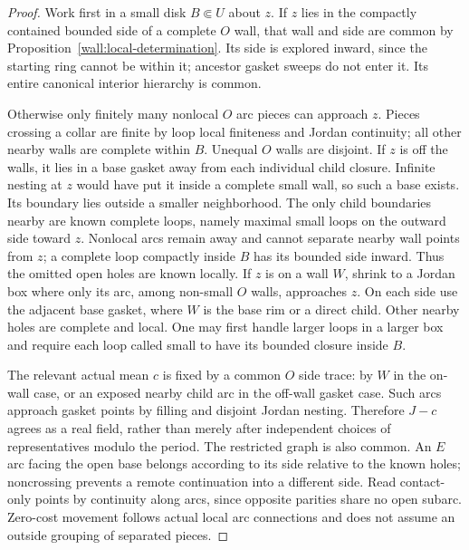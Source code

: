 \begin{proof}
Work first in a small disk $B\Subset U$ about $z$.  If $z$ lies in the compactly contained bounded side of a complete $O$ wall, that wall and side are common by Proposition~\ref{wall:local-determination}.  Its side is explored inward, since the starting ring cannot be within it; ancestor gasket sweeps do not enter it.  Its entire canonical interior hierarchy is common.

Otherwise only finitely many nonlocal $O$ arc pieces can approach $z$.  Pieces crossing a collar are finite by loop local finiteness and Jordan continuity; all other nearby walls are complete within $B$.  Unequal $O$ walls are disjoint.  If $z$ is off the walls, it lies in a base gasket away from each individual child closure.  Infinite nesting at $z$ would have put it inside a complete small wall, so such a base exists.  Its boundary lies outside a smaller neighborhood.  The only child boundaries nearby are known complete loops, namely maximal small loops on the outward side toward $z$.  Nonlocal arcs remain away and cannot separate nearby wall points from $z$; a complete loop compactly inside $B$ has its bounded side inward.  Thus the omitted open holes are known locally.  If $z$ is on a wall $W$, shrink to a Jordan box where only its arc, among non-small $O$ walls, approaches $z$.  On each side use the adjacent base gasket, where $W$ is the base rim or a direct child.  Other nearby holes are complete and local.  One may first handle larger loops in a larger box and require each loop called small to have its bounded closure inside $B$.

The relevant actual mean $c$ is fixed by a common $O$ side trace: by $W$ in the on-wall case, or an exposed nearby child arc in the off-wall gasket case.  Such arcs approach gasket points by filling and disjoint Jordan nesting.  Therefore $J-c$ agrees as a real field, rather than merely after independent choices of representatives modulo the period.  The restricted graph is also common.  An $E$ arc facing the open base belongs according to its side relative to the known holes; noncrossing prevents a remote continuation into a different side.  Read contact-only points by continuity along arcs, since opposite parities share no open subarc.  Zero-cost movement follows actual local arc connections and does not assume an outside grouping of separated pieces.


\end{proof}
